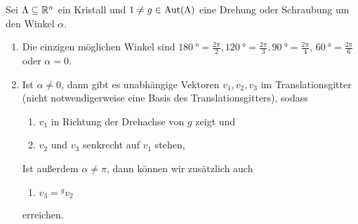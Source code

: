 \begin{theorem}\label{kristalle:kristallographische_einschränkung}
Sei $\Lambda\subseteq\mathbb{R}^n$ ein Kristall und $1\neq g\in\operatorname{Aut}(\Lambda)$ eine Drehung oder Schraubung um den Winkel $\alpha$.
\begin{enumerate}
\item Die einzigen möglichen Winkel sind $\SI{180}{\degree}=\frac{2\pi}{2}, \SI{120}{\degree}= \frac{2\pi}{3}, \SI{90}{\degree}=\frac{2\pi}{4}$, $\SI{60}{\degree}=\frac{2\pi}{6}$ oder $\alpha=0$.
\item Ist $\alpha\neq 0$, dann gibt es unabhängige Vektoren $v_1, v_2, v_3$ im Translationsgitter (nicht notwendigerweise eine Basis des Translationsgitters), sodass
\begin{enumerate}
\item $v_1$ in Richtung der Drehachse von $g$ zeigt und
\item $v_2$ und $v_3$ senkrecht auf $v_1$ stehen,
\end{enumerate}
Ist außerdem $\alpha\neq\pi$, dann können wir zusätzlich auch
\begin{enumerate}[resume]
\item $v_3={^g v_2}$
\end{enumerate}
erreichen.
\end{enumerate}
\end{theorem}

